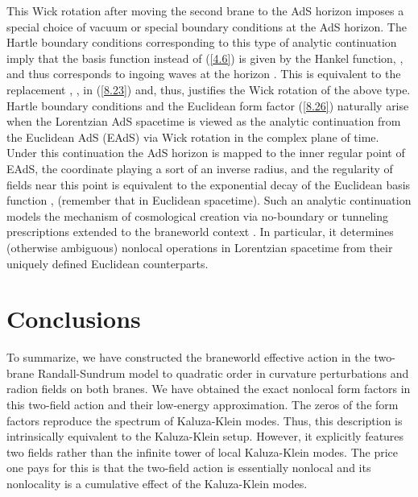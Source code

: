 \documentclass[a4paper,preprint,nofootinbib,
                 showpacs,preprintnumbers,amsmath,amssymb]{revtex4}
\begin{document}
This Wick rotation after moving the second brane to the AdS 
horizon imposes a special choice of vacuum or special boundary 
conditions at the AdS horizon. The Hartle boundary conditions 
corresponding to this type of analytic continuation imply that the 
basis function \coordHE{} instead of (\ref{4.6}) is given by the 
Hankel function, 
\coordHE{}, 
and thus corresponds to ingoing waves at the horizon 
\cite{GKR,BalGiLa,BalKraLa}. This is equivalent to the replacement 
\coordHE{}, \coordHE{}, in (\ref{8.23}) and, thus, 
justifies the Wick rotation of the above type. Hartle boundary 
conditions and the Euclidean form factor (\ref{8.26}) naturally 
arise when the Lorentzian AdS spacetime is viewed as the analytic 
continuation from the Euclidean AdS (EAdS) via Wick rotation in 
the complex plane of time. Under this continuation the AdS horizon 
is mapped to the inner regular point of EAdS, the coordinate \coordHE{} 
playing a sort of an inverse radius, and the regularity of fields 
near this point is equivalent to the exponential decay of the 
Euclidean basis function \coordHE{}, 
\coordHE{} (remember that \coordHE{} in Euclidean spacetime). Such 
an analytic continuation models the mechanism of cosmological 
creation via no-boundary \cite{HH} or tunneling \cite{tun} 
prescriptions extended to the braneworld context 
\cite{GarSas,HHR1,HHR2,brane}. In particular, it determines 
(otherwise ambiguous) nonlocal operations in Lorentzian spacetime 
from their uniquely defined Euclidean counterparts. 
 
 
\section{Conclusions\label{conclusions}} 
 
To summarize, we have constructed the braneworld effective action in the 
two-brane Randall-Sundrum model to quadratic order in curvature perturbations 
and radion fields on both branes. We have obtained the exact nonlocal form 
factors in this two-field action and their low-energy approximation. The zeros 
of the form factors reproduce the spectrum of Kaluza-Klein modes. Thus, this 
description is intrinsically equivalent to the Kaluza-Klein setup.  However, 
it explicitly features two fields rather than the infinite tower of local 
Kaluza-Klein modes. The price one pays for this is that the 
two-field action is essentially nonlocal and its nonlocality is a cumulative 
effect of the Kaluza-Klein modes.  
 
\end{document}
